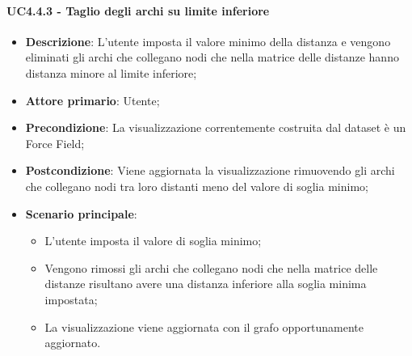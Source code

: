 \paragraph{UC4.4.3 - Taglio degli archi su limite inferiore}
\label{par:uc4.4.3}
\begin{itemize}
    \item \textbf{Descrizione}:     L'utente imposta il valore minimo della distanza e vengono eliminati gli archi che collegano nodi che nella matrice delle distanze hanno distanza minore al limite inferiore;
    \item \textbf{Attore primario}: Utente;
    \item \textbf{Precondizione}:   La visualizzazione correntemente costruita dal dataset è un Force Field;
    \item \textbf{Postcondizione}:  Viene aggiornata la visualizzazione rimuovendo gli archi  che collegano nodi tra loro distanti meno del valore di soglia minimo;
    \item \textbf{Scenario principale}:
    \begin{itemize}
        \item L'utente imposta il valore di soglia minimo;
        \item Vengono rimossi gli archi che collegano nodi che nella matrice delle distanze risultano avere una distanza inferiore alla soglia minima impostata;
        \item La visualizzazione viene aggiornata con il grafo opportunamente aggiornato.
    \end{itemize}
\end{itemize}

